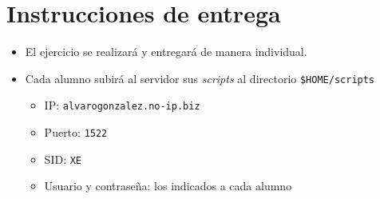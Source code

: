 \section{Instrucciones de entrega}
\begin{itemize}
\item El ejercicio se realizará y entregará de manera individual.
\item Cada alumno subirá al servidor sus \textit{scripts} al directorio \texttt{\$HOME/scripts}
  \begin{itemize}
  \item IP: \texttt{alvarogonzalez.no-ip.biz}
  \item Puerto: \texttt{1522}
  \item SID: \texttt{XE}
  \item Usuario y contraseña: los indicados a cada alumno
  \end{itemize}
\end{itemize}



